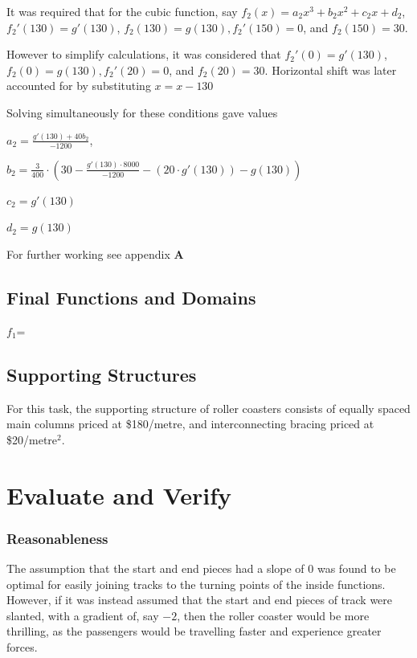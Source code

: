 \documentclass[11pt, letterpaper]{article}
\begin{document}
It was required that for the cubic function, say $f_2(x)=a_2x^3+b_2x^2+c_2x+d_2$, $f_2'(130)=g'(130)$, $f_2(130)=g(130), f_2'(150)=0$, and $f_2(150)=30$. 
	
However to simplify calculations, it was considered that $f_2'(0)=g'(130)$, $f_2(0)=g(130), f_2'(20)=0$, and $f_2(20)=30$. Horizontal shift was later accounted for by substituting $x=x-130$
	

Solving simultaneously for these conditions gave values 
	
	$a_{2}=\frac{g'\left(130\right)+40b_{2}}{-1200}$, 
	
	$b_{2}=\frac{3}{400}\cdot\left(30-\frac{g'\left(130\right)\cdot8000}{-1200}-\left(20\cdot g'\left(130\right)\right)-g\left(130\right)\right)$
	
	$c_{2}=g'\left(130\right)$
	
	$d_{2}=g\left(130\right)$

For further working see appendix $\mathbf{A}$
	


\subsection{Final Functions and Domains}

$f_1$=


\subsection{Supporting Structures}
For this task, the supporting structure of roller coasters consists of equally spaced main columns priced at \$180/metre, and interconnecting bracing priced at \$20/metre$^2$.


\section{Evaluate and Verify}
\subsubsection{Reasonableness}



The assumption that the start and end pieces had a slope of 0 was found to be optimal for easily joining tracks to the  turning points of the inside functions. However, if it was instead assumed that the start and end pieces of track were slanted, with a gradient of, say $-2$, then the roller coaster would be more thrilling, as the passengers would be travelling faster and experience greater forces.
\end{document}
